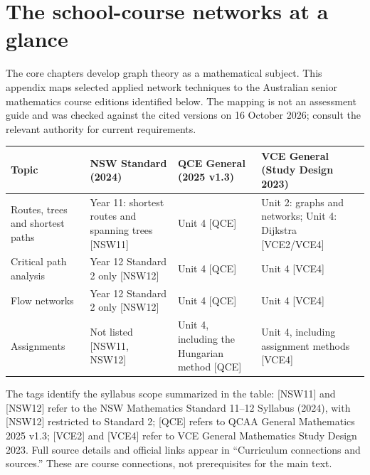 \chapter{The school-course networks at a glance}
The core chapters develop graph theory as a mathematical subject. This appendix maps selected applied network techniques to the Australian senior mathematics course editions identified below. The mapping is not an assessment guide and was checked against the cited versions on 16 October 2026; consult the relevant authority for current requirements.

\begin{center}
\small
\begin{tabularx}{\textwidth}{>{\raggedright\arraybackslash}p{}*{3}{>{\raggedright\arraybackslash}X}}
\toprule
Topic & \shortstack[l]{NSW Standard\\(2024)} & \shortstack[l]{QCE General\\(2025 v1.3)} & \shortstack[l]{VCE General\\(Study Design 2023)}\\
\midrule
Routes, trees and shortest paths & Year 11: shortest routes and spanning trees [NSW11] & Unit 4 [QCE] & Unit 2: graphs and networks; Unit 4: Dijkstra [VCE2/VCE4]\\
Critical path analysis & Year 12 Standard 2 only [NSW12] & Unit 4 [QCE] & Unit 4 [VCE4]\\
Flow networks & Year 12 Standard 2 only [NSW12] & Unit 4 [QCE] & Unit 4 [VCE4]\\
Assignments & Not listed [NSW11, NSW12] & Unit 4, including the Hungarian method [QCE] & Unit 4, including assignment methods [VCE4]\\
\bottomrule
\end{tabularx}
\end{center}

The tags identify the syllabus scope summarized in the table: [NSW11] and [NSW12] refer to the NSW Mathematics Standard 11--12 Syllabus (2024), with [NSW12] restricted to Standard 2; [QCE] refers to QCAA General Mathematics 2025 v1.3; [VCE2] and [VCE4] refer to VCE General Mathematics Study Design 2023. Full source details and official links appear in ``Curriculum connections and sources.'' These are course connections, not prerequisites for the main text.
